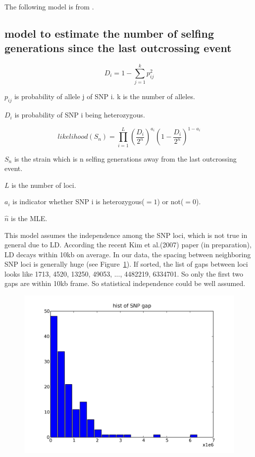 \documentclass[a4paper,10pt]{article}
\begin{document}
The following model is from \cite{Enjalbert2000}.

\subsection{model to estimate the number of selfing generations since the last outcrossing event}
\begin{equation}
D_i = 1 - \sum_{j=1}^k p_{ij}^2
\end{equation}


$p_{ij}$ is probability of allele j of SNP i. k is the number of alleles.

$D_i$ is probability of SNP i being heterozygous.


\begin{equation}
likelihood(S_n) = \prod_{i=1}^L {(\frac{D_i}{2^n})}^{a_i} {(1-\frac{D_i}{2^n})}^{1-a_i}
\end{equation}

$S_n$ is the strain which is n selfing generations away from the last outcrossing event.

$L$ is the number of loci.

$a_i$ is indicator whether SNP i is heterozygous($=1$) or not($=0$).

$\hat{n}$ is the MLE.

This model assumes the independence among the SNP loci, which is not true in general due to LD. According the recent Kim et al.(2007) paper (in preparation), LD decays within 10kb on average. In our data, the spacing between neighboring SNP loci is generally huge (see Figure~\ref{f7}). If sorted, the list of gaps between loci looks like 1713, 4520, 13250, 49053, ..., 4482219, 6334701. So only the first two gaps are within 10kb frame. So statistical independence could be well assumed.

\begin{figure}
\includegraphics[width=1\textwidth]{figures/snp_locus_gap_hist.png}
\caption{}\label{f7}
\end{figure}
\end{document}

